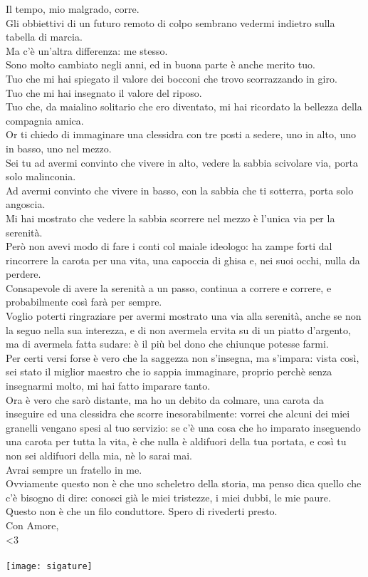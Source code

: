 \documentclass[17pt]{extletter}
\begin{document}
Il tempo, mio malgrado, corre.\\
Gli obbiettivi di un futuro remoto di colpo sembrano vedermi indietro sulla tabella di marcia.\\
Ma c'è un'altra differenza: me stesso.\\
Sono molto cambiato negli anni, ed in buona parte è anche merito tuo.\\
Tuo che mi hai spiegato il valore dei bocconi che trovo scorrazzando in giro.\\
Tuo che mi hai insegnato il valore del riposo.\\
Tuo che, da maialino solitario che ero diventato, mi hai ricordato la bellezza della compagnia amica.\\
Or ti chiedo di immaginare una clessidra con tre posti a sedere, uno in alto, uno in basso, uno nel mezzo.\\
Sei tu ad avermi convinto che vivere in alto, vedere la sabbia scivolare via, porta solo malinconia.\\
Ad avermi convinto che vivere in basso, con la sabbia che ti sotterra, porta solo angoscia.\\
Mi hai mostrato che vedere la sabbia scorrere nel mezzo è l'unica via per la serenità.\\
Però non avevi modo di fare i conti col maiale ideologo: ha zampe forti dal rincorrere la carota per una vita, una capoccia di ghisa e, nei suoi occhi, nulla da perdere.\\
Consapevole di avere la serenità a un passo, continua a correre e correre, e probabilmente così farà per sempre.\\
Voglio poterti ringraziare per avermi mostrato una via alla serenità, anche se non la seguo nella sua interezza, e di non avermela ervita su di un piatto d'argento, ma di avermela fatta sudare: è il più bel dono che chiunque potesse farmi.\\
Per certi versi forse è vero che la saggezza non s'insegna, ma s'impara: vista così, sei stato il miglior maestro che io sappia immaginare, proprio perchè senza insegnarmi molto, mi hai fatto imparare tanto.\\
Ora è vero che sarò distante, ma ho un debito da colmare, una carota da inseguire ed una clessidra che scorre inesorabilmente: vorrei che alcuni dei miei granelli vengano spesi al tuo servizio: se c'è una cosa che ho imparato inseguendo una carota per tutta la vita, è che nulla è aldifuori della tua portata, e così tu non sei aldifuori della mia, nè lo sarai mai.\\
Avrai sempre un fratello in me.\\
Ovviamente questo non è che uno scheletro della storia, ma penso dica quello che c'è bisogno di dire: conosci già le miei tristezze, i miei dubbi, le mie paure. Questo non è che un filo conduttore. Spero di rivederti presto.\\
Con Amore, \\
<3\\\\
\texttt{[image: sigature]}
\end{document}
